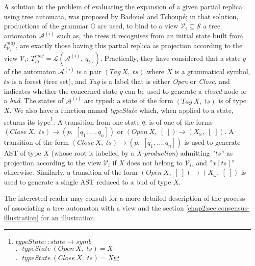 A solution to the problem of evaluating the expansion of a given partial replica using tree automata, was proposed by Badouel and Tchoup\'e; in that solution, productions of the grammar $\mathbb{G}$ are used, to bind to a view $\mathcal{V}_i \subseteq \mathcal{S}$ a tree automaton $\mathcal{A}^{(i)}$ such as, the trees it recognises from an initial state built from $t_{\mathcal{V}_i}^{maj}$, are exactly those having this partial replica as projection according to the view $\mathcal{V}_i$:
$ T_{i\mathcal{S}}^{maj} = \mathscr{L}\left(\mathcal{A}^{(i)},~q_{t_{\mathcal{V}_i}}\right) $. 
Practically, they have considered that a state $q$ of the automaton $\mathcal{A}^{(i)}$ is a pair $\left(Tag ~X, \;ts\right)$ where $X$ is a grammatical symbol, $ts$ is a forest (tree set), and \textit{Tag} is a label that is either \textit{Open} or \textit{Close}, and indicates whether the concerned state $q$ can be used to generate a \textit{closed} node or a \textit{bud}. The states of $\mathcal{A}^{(i)}$ are typed: a state of the form $\left(Tag ~X, \;ts\right)$ is of type $X$. We also have a function named \textit{typeState} which, when applied to a state, returns its type\footnote{ $typeState :: state\rightarrow symb$ \\
 $.~~~typeState ~\left(Open ~X, \;ts\right) = X$\\
 $.~~~typeState ~\left(Close ~X, \;ts\right) = X$
	}.
A transition from one state $q$, is of one of the forms $\left(Close~X, \;ts \right) \rightarrow \left(p, \;[q_1, \ldots, q_n]\right)$ or $\left(Open ~X, \;[\;]\right) \rightarrow \left(X_\omega, \;[\;]\right)$. 
A transition of the form $\left(Close~X, \;ts \right) \rightarrow \left(p, \;[q_1, \ldots, q_n]\right)$ is used to generate AST of type $X$ (whose root is labelled by a \textit{X-production}) admitting ''$ts$'' as projection according to the view ${\mathcal{V}_i}$ if $X$ does not belong to ${\mathcal{V}_i}$, and ''$x [ ts ]$'' otherwise.
Similarly, a transition of the form $\left(Open ~X, \;[\;]\right) \rightarrow \left(X_\omega, \;[\;]\right)$ is used to generate a single AST reduced to a bud of type $X$. 

The interested reader may consult \cite{badouelTchoupeCmcs} for a more detailed description of the process of associating a tree automaton with a view and the section \ref{chap2:sec:consensus-illustration} for an illustration.
